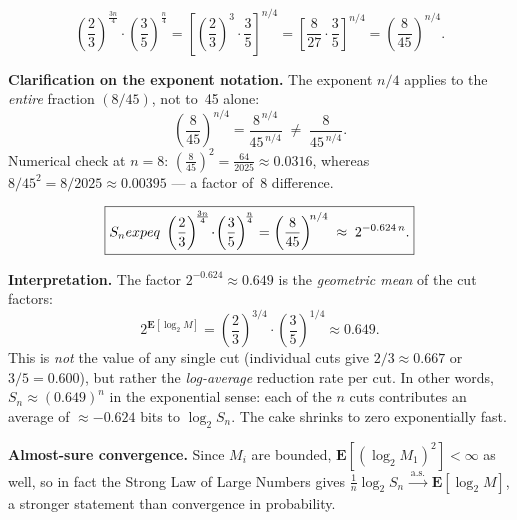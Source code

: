 \documentclass[12pt,a4paper]{article}
\theoremstyle{plain}
\theoremstyle{definition}
\theoremstyle{remark}
\newcommand{\EE}{\mathbf{E}}
\newcommand{\expeq}{\;\dot{=}\;}       %
\begin{document}
\[
  \left(\frac{2}{3}\right)^{\!\frac{3n}{4}}
  \cdot
  \left(\frac{3}{5}\right)^{\!\frac{n}{4}}
  =
  \left[\left(\frac{2}{3}\right)^{\!3}\cdot\frac{3}{5}\right]^{\!n/4}
  =
  \left[\frac{8}{27}\cdot\frac{3}{5}\right]^{\!n/4}
  =
  \left(\frac{8}{45}\right)^{\!n/4}.
\]

\begin{notebox}
\textbf{Clarification on the exponent notation.}
The exponent $n/4$ applies to the \emph{entire} fraction $(8/45)$, not to~45 alone:
\[
  \left(\frac{8}{45}\right)^{\!n/4}
    = \frac{8^{\,n/4}}{45^{\,n/4}}
    \;\neq\;
    \frac{8}{45^{\,n/4}}.
\]
Numerical check at $n=8$:\quad
$\left(\tfrac{8}{45}\right)^{\!2} = \tfrac{64}{2025}\approx 0.0316$,\quad
whereas $8/45^{2} = 8/2025\approx 0.00395$ — a factor of~8 difference.
\end{notebox}

\begin{resultbox}
\[
  \boxed{S_n \;\\expeq\;
    \left(\frac{2}{3}\right)^{\!\frac{3n}{4}}
    \!\cdot\!
    \left(\frac{3}{5}\right)^{\!\frac{n}{4}}
    =
    \left(\frac{8}{45}\right)^{\!n/4}
    \;\approx\; 2^{-0.624\,n}.}
\]
\end{resultbox}

\begin{notebox}
\textbf{Interpretation.}
The factor $2^{-0.624}\approx 0.649$ is the \emph{geometric mean} of the cut
factors:
\[
  2^{\EE[\log_2 M]}
    = \left(\frac{2}{3}\right)^{\!3/4}\!\cdot\!\left(\frac{3}{5}\right)^{\!1/4}
    \approx 0.649.
\]
This is \emph{not} the value of any single cut (individual cuts give $2/3\approx0.667$
or $3/5=0.600$), but rather the \emph{log-average} reduction rate per cut.
In other words, $S_n\approx(0.649)^n$ in the exponential sense: each of the
$n$ cuts contributes an average of $\approx -0.624$ bits to $\log_2 S_n$.
The cake shrinks to zero exponentially fast.
\end{notebox}

\begin{notebox}
\textbf{Almost-sure convergence.}
Since $M_i$ are bounded, $\EE[(\log_2 M_1)^2]<\infty$ as well, so in fact
the Strong Law of Large Numbers gives
$\frac{1}{n}\log_2 S_n \xrightarrow{\;\text{a.s.}\;} \EE[\log_2 M]$,
a stronger statement than convergence in probability.
\end{notebox}
\end{document}
